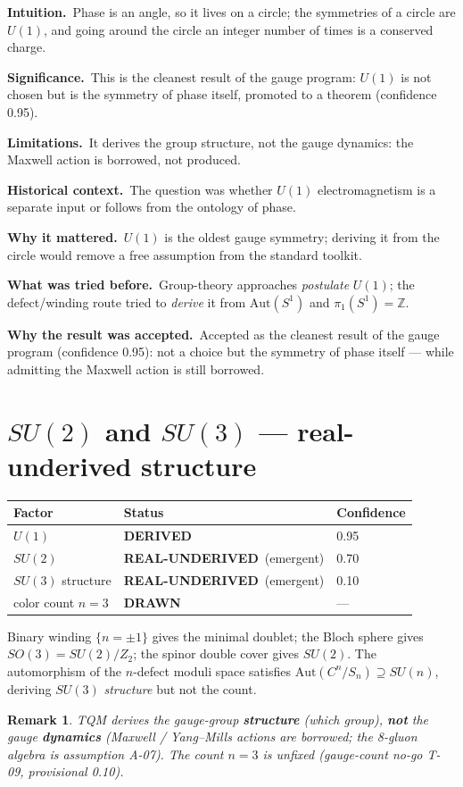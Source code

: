 \documentclass[10pt,twoside,openany]{book}
\newtheorem{remark}[theorem]{Remark}
\newcommand{\derived}{\textbf{DERIVED}}
\newcommand{\realunder}{\textbf{REAL-UNDERIVED}}
\newcommand{\drawn}{\textbf{DRAWN}}
\newcommand{\theoremnotes}[3]{%
  \par\medskip\noindent
  \textbf{Intuition.}\ #1\par
  \textbf{Significance.}\ #2\par
  \textbf{Limitations.}\ #3\par}
\newcommand{\historynotes}[4]{%
  \par\smallskip\noindent
  \textbf{Historical context.}\ #1\par
  \textbf{Why it mattered.}\ #2\par
  \textbf{What was tried before.}\ #3\par
  \textbf{Why the result was accepted.}\ #4\par}
\begin{document}
\theoremnotes
{Phase is an angle, so it lives on a circle; the symmetries of a circle are $U(1)$, and
going around the circle an integer number of times is a conserved charge.}
{This is the cleanest result of the gauge program: $U(1)$ is not chosen but is the symmetry
of phase itself, promoted to a theorem (confidence 0.95).}
{It derives the group structure, not the gauge dynamics: the Maxwell action is borrowed, not
produced.}

\historynotes
{The question was whether $U(1)$ electromagnetism is a separate input or follows from the
ontology of phase.}
{$U(1)$ is the oldest gauge symmetry; deriving it from the circle would remove a free
assumption from the standard toolkit.}
{Group-theory approaches \emph{postulate} $U(1)$; the defect/winding route tried to
\emph{derive} it from $\mathrm{Aut}(S^1)$ and $\pi_1(S^1)=\mathbb Z$.}
{Accepted as the cleanest result of the gauge program (confidence 0.95): not a choice but
the symmetry of phase itself --- while admitting the Maxwell action is still borrowed.}

\section{$SU(2)$ and $SU(3)$ — real-underived structure}

\begin{center}
\begin{tabular}{lll}
\toprule
Factor & Status & Confidence \\
\midrule
$U(1)$ & \derived & 0.95 \\
$SU(2)$ & \realunder\ (emergent) & 0.70 \\
$SU(3)$ structure & \realunder\ (emergent) & 0.10 \\
color count $n=3$ & \drawn & — \\
\bottomrule
\end{tabular}
\end{center}

Binary winding $\{n=\pm1\}$ gives the minimal doublet; the Bloch sphere gives
$SO(3)=SU(2)/Z_2$; the spinor double cover gives $SU(2)$. The automorphism of the
$n$-defect moduli space satisfies $\mathrm{Aut}(C^n/S_n)\supseteq SU(n)$, deriving
$SU(3)$ \emph{structure} but not the count.

\begin{remark}
TQM derives the gauge-group \textbf{structure} (which group), \textbf{not} the gauge
\textbf{dynamics} (Maxwell / Yang--Mills actions are borrowed; the 8-gluon algebra is
assumption A-07). The count $n=3$ is unfixed (gauge-count no-go T-09, provisional 0.10).
\end{remark}
\end{document}
